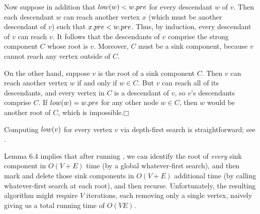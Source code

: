 Now suppose in addition that $low(w) < w.pre$ for every descendant $w$ of $v$.
Then each descendant $w$ can reach another vertex $x$ (which must be another descendant of $v$) such that $x.pre < w.pre$.
Thus, by induction, every descendant of $v$ can reach $v$.
It follows that the descendants of $v$ comprise the strong component $C$ whose root is $v$.
Moreover, $C$ must be a sink component, because $v$ cannot reach any vertex outside of $C$.

On the other hand, suppose $v$ is the root of a sink component $C$.
Then $v$ can reach another vertex $w$ if and only if $w \in C$.
But $v$ can reach all of its descendants, and every vertex in $C$ is a descendant of $v$, so $v$’s descendants comprise $C$.
If $low(w) = w.pre$ for any other node $w \in C$, then $w$ would be another root of $C$, which is impossible.\hfill$\mdlgwhtsquare$

\medskip
Computing $low(v)$ for every vertex $v$ via depth-first search is straightforward; see .

Lemma 6.4 implies that after running , we can identify the root of \textit{every} sink component in $O(V+E)$ time (by a global whatever-first search), and then mark and delete those sink components in $O(V+E)$ additional time (by calling whatever-first search at each root), and then recurse.
Unfortunately, the resulting algorithm might require $V$ iterations, each removing only a single vertex, naively giving us a total running time of $O(VE)$.

